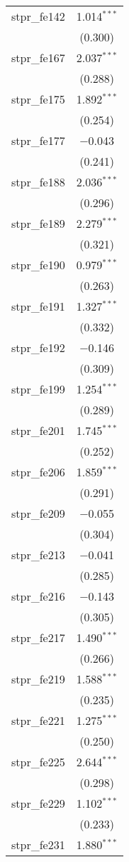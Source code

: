 \begin{table}[!htbp]
\begin{tabular}{@{\extracolsep{5pt}}lc}
  stpr\_fe142 & 1.014$^{***}$ \\ 
  & (0.300) \\ 
  stpr\_fe167 & 2.037$^{***}$ \\ 
  & (0.288) \\ 
  stpr\_fe175 & 1.892$^{***}$ \\ 
  & (0.254) \\ 
  stpr\_fe177 & $-$0.043 \\ 
  & (0.241) \\ 
  stpr\_fe188 & 2.036$^{***}$ \\ 
  & (0.296) \\ 
  stpr\_fe189 & 2.279$^{***}$ \\ 
  & (0.321) \\ 
  stpr\_fe190 & 0.979$^{***}$ \\ 
  & (0.263) \\ 
  stpr\_fe191 & 1.327$^{***}$ \\ 
  & (0.332) \\ 
  stpr\_fe192 & $-$0.146 \\ 
  & (0.309) \\ 
  stpr\_fe199 & 1.254$^{***}$ \\ 
  & (0.289) \\ 
  stpr\_fe201 & 1.745$^{***}$ \\ 
  & (0.252) \\ 
  stpr\_fe206 & 1.859$^{***}$ \\ 
  & (0.291) \\ 
  stpr\_fe209 & $-$0.055 \\ 
  & (0.304) \\ 
  stpr\_fe213 & $-$0.041 \\ 
  & (0.285) \\ 
  stpr\_fe216 & $-$0.143 \\ 
  & (0.305) \\ 
  stpr\_fe217 & 1.490$^{***}$ \\ 
  & (0.266) \\ 
  stpr\_fe219 & 1.588$^{***}$ \\ 
  & (0.235) \\ 
  stpr\_fe221 & 1.275$^{***}$ \\ 
  & (0.250) \\ 
  stpr\_fe225 & 2.644$^{***}$ \\ 
  & (0.298) \\ 
  stpr\_fe229 & 1.102$^{***}$ \\ 
  & (0.233) \\ 
  stpr\_fe231 & 1.880$^{***}$ \\ 

\end{tabular}
\end{table}

